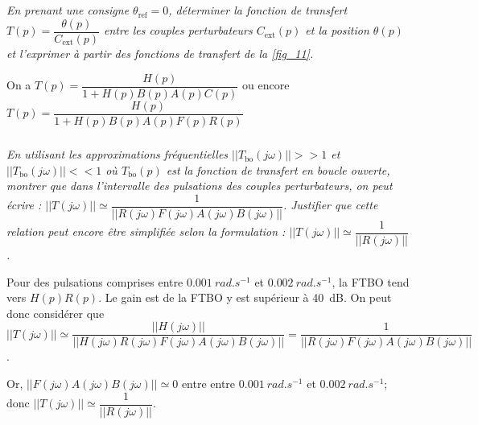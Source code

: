 \subparagraph{\label{q_18}}\textit{En prenant une consigne $\theta_{\text{ref}} = 0$, déterminer la fonction de transfert $T(p) = \dfrac{\theta(p)}{C_{\text{ext}}(p)}$ entre les couples perturbateurs $C_{\text{ext}}(p)$ et la position $\theta(p)$ et l’exprimer à partir des fonctions de transfert de la \autoref{fig_11}.}
\ifprof
\begin{corrige}
On a $T(p)=\dfrac{H(p)}{1+H(p)B(p)A(p)C(p)}$ ou encore $T(p)=\dfrac{H(p)}{1+H(p)B(p)A(p)F(p)R(p)}$
\end{corrige}
\else
\fi

\subparagraph{\label{q_19}}\textit{En utilisant les approximations fréquentielles 
$||T_{\text{bo}}(j\omega)||>>1$ et
$||T_{\text{bo}}(j\omega)||<<1$
où $T_{\text{bo}}(p)$ est la fonction
de transfert en boucle ouverte, montrer que dans l’intervalle des pulsations des couples perturbateurs, 
on peut écrire : 
$||T(j\omega)||\simeq \dfrac{1}{|| R\left(j\omega\right) F\left(j\omega\right) A\left(j\omega\right) B\left(j\omega\right)|| }$. 
 Justifier que cette relation peut encore être simplifiée selon la formulation :
 $||T(j\omega)||\simeq \dfrac{1}{|| R\left(j\omega\right)||}$.}

\ifprof
\begin{corrige}
Pour des pulsations comprises entre $\SI{0,001}{rad.s^{-1}}$ et $\SI{0,002}{rad.s^{-1}}$, la FTBO tend vers $H(p)R(p)$.
Le gain est de la FTBO y est supérieur à \SI{40}{dB}. On peut donc considérer que 
$||T(j\omega)||\simeq \dfrac{||H\left(j\omega\right)||}{|| H\left(j\omega\right) R\left(j\omega\right) F\left(j\omega\right) A\left(j\omega\right) B\left(j\omega\right)|| } = \dfrac{1}{|| R\left(j\omega\right) F\left(j\omega\right) A\left(j\omega\right) B\left(j\omega\right)|| }$.

Or, $||F\left(j\omega\right) A\left(j\omega\right) B\left(j\omega\right)|| \simeq 0$ entre  entre $\SI{0,001}{rad.s^{-1}}$ et $\SI{0,002}{rad.s^{-1}}$; donc $||T(j\omega)||\simeq \dfrac{1}{|| R\left(j\omega\right)||}$.

\end{corrige}
\else
\fi


